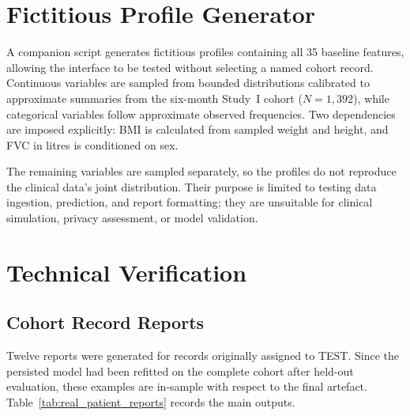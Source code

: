 \section{Fictitious Profile Generator}
\label{subsec:methods_random_patient}

A companion script generates fictitious profiles containing all 35 baseline features, allowing the interface to be tested without selecting a named cohort record. Continuous variables are sampled from bounded distributions calibrated to approximate summaries from the six-month Study~I cohort ($N=1{,}392$), while categorical variables follow approximate observed frequencies. Two dependencies are imposed explicitly: \gls{BMI} is calculated from sampled weight and height, and \gls{FVC} in litres is conditioned on sex.

The remaining variables are sampled separately, so the profiles do not reproduce the clinical data's joint distribution. Their purpose is limited to testing data ingestion, prediction, and report formatting; they are unsuitable for clinical simulation, privacy assessment, or model validation.

\section{Technical Verification}
\label{app:patient_report_results}

\subsection{Cohort Record Reports}
\label{subsec:results_real_reports}

Twelve reports were generated for records originally assigned to \gls{TEST}. Since the persisted model had been refitted on the complete cohort after held-out evaluation, these examples are in-sample with respect to the final artefact. Table~\ref{tab:real_patient_reports} records the main outputs.

